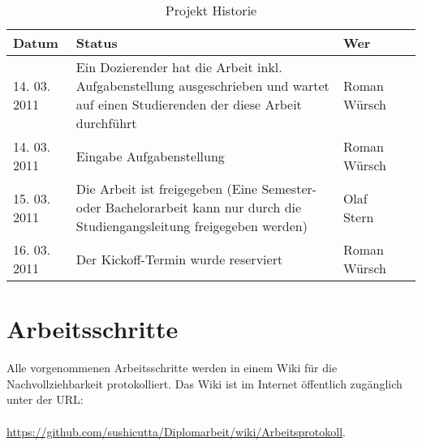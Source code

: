   \begin{table}[h]
    \begin{center}
      \begin{tabular}{lp{7cm}ll}
        \toprule
        Datum & Status & Wer \\
        \midrule
        14. 03. 2011 & Ein Dozierender hat die Arbeit inkl. Aufgabenstellung
        ausgeschrieben und wartet auf einen Studierenden der  diese Arbeit
        durchführt & Roman Würsch\\
        14. 03. 2011 & Eingabe Aufgabenstellung & Roman Würsch\\
        15. 03. 2011 & Die Arbeit ist freigegeben (Eine Semester- oder
        Bachelorarbeit kann nur durch die Studiengangsleitung freigegeben
        werden) & Olaf Stern\\
        16. 03. 2011 & Der Kickoff-Termin wurde reserviert & Roman Würsch\\
        \bottomrule
      \end{tabular}
      \caption{Projekt Historie}
      \label{tab:projekthistorie}
    \end{center}
  \end{table}
  
  \section{Arbeitsschritte}
  
  Alle vorgenommenen Arbeitsschritte werden in einem Wiki für die
  Nachvollziehbarkeit protokolliert. Das Wiki ist im Internet öffentlich
  zugänglich unter der \ac{URL}:\\
  \\
  \url{https://github.com/sushicutta/Diplomarbeit/wiki/Arbeitsprotokoll}.